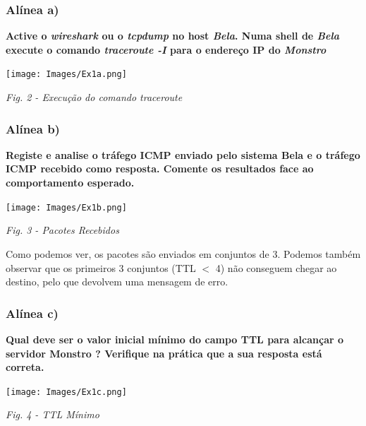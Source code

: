 \documentclass{article}
\begin{document}
\subsubsection{Alínea a)}
\textbf{Active o \textit{wireshark} ou o \textit{tcpdump} no host \textit{Bela}. Numa shell de \textit{Bela} execute o comando \textit{traceroute -I} para o endereço IP do \textit{Monstro}}\par
\vspace{1 cm}
\begin{center}
    \texttt{[image: Images/Ex1a.png]}
\caption{\textit{Fig. 2 - Execução do comando \textit{traceroute}}}
\vspace{2 cm}
\end{center}


\subsubsection{Alínea b)}
\textbf{Registe e analise o tráfego ICMP enviado pelo sistema Bela e o tráfego ICMP recebido como resposta. Comente os resultados face ao comportamento esperado.}\par
\vspace{0.5 cm}
\begin{center}
    \texttt{[image: Images/Ex1b.png]}
\caption{\textit{Fig. 3 - Pacotes Recebidos}}
\par\vspace{0.5cm}
\end{center}

\hspace{0.5cm}Como podemos ver, os pacotes são enviados em conjuntos de 3. Podemos também observar que os primeiros 3 conjuntos (TTL $<$ 4) não conseguem chegar ao destino, pelo que devolvem uma mensagem de erro. \par\vspace{0.35cm}

\subsubsection{Alínea c)}
\textbf{Qual deve ser o valor inicial mínimo do campo TTL para alcançar o servidor Monstro ? Verifique na prática que a sua resposta está correta.}\par
\vspace{0.35 cm}
\begin{center}
    \texttt{[image: Images/Ex1c.png]}
\caption{\textit{Fig. 4 - TTL Mínimo}}\par\vspace{0.02cm}
\end{center}
\end{document}
